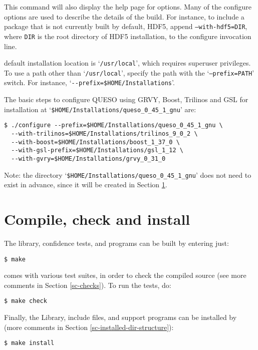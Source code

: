 This command will also display the help page for \Queso{} options. 
 Many of the \Queso{} configure options are used to describe the details of the build. For instance, to include a package that is not currently built by default, HDF5, append \texttt{--with-hdf5=DIR}, where \texttt{DIR} is the root directory of HDF5 installation,  to the configure invocation line. 

 \Queso{} default installation location is `\texttt{/usr/local}', which requires superuser privileges. To use a path
        other than `\texttt{/usr/local}', specify the path with the `\texttt{--prefix=PATH}' switch. For instance, `\verb+--prefix=$HOME/Installations+'.



The basic steps to configure QUESO using GRVY, Boost, Trilinos and GSL for installation at `\verb+$HOME/Installations/queso_0_45_1_gnu+' are:
\begin{lstlisting}
$ ./configure --prefix=$HOME/Installations/queso_0_45_1_gnu \
  --with-trilinos=$HOME/Installations/trilinos_9_0_2 \
  --with-boost=$HOME/Installations/boost_1_37_0 \
  --with-gsl-prefix=$HOME/Installations/gsl_1_12 \
  --with-gvry=$HOME/Installations/grvy_0_31_0
\end{lstlisting}

Note: the directory `\verb+$HOME/Installations/queso_0_45_1_gnu+' does not need to exist in advance, since it will be created in Section \ref{sec:install_Queso_make}.


\section{Compile, check and install \Queso{}}\label{sec:install_Queso_make}
%
The library, confidence tests, and programs can be built by entering just:
\begin{lstlisting}
$ make
\end{lstlisting}

\Queso{} comes with various test suites, in order to check the compiled source (see more comments in Section \ref{sc-checks}). To run the tests, do:
\begin{lstlisting}
$ make check
\end{lstlisting}

Finally, the \Queso{} Library, include files, and support programs can be installed by (more comments in Section \ref{sc-installed-dir-structure}):
\begin{lstlisting}
$ make install 
\end{lstlisting}

